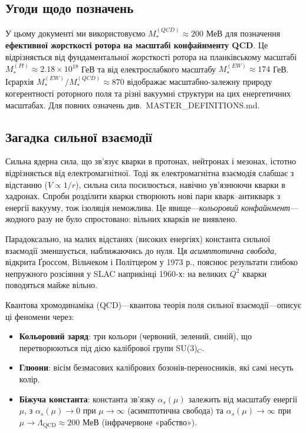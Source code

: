 \documentclass[11pt,a4paper]{article}
\theoremstyle{definition}
\theoremstyle{plain}
\theoremstyle{remark}
\begin{document}
\subsection{Угоди щодо позначень}

У цьому документі ми використовуємо $M_*^{(QCD)} \approx 200$ МеВ для позначення \textbf{ефективної жорсткості ротора на масштабі конфайнменту QCD}. Це відрізняється від фундаментальної жорсткості ротора на планківському масштабі $M_*^{(Pl)} \approx 2{.}18 \times 10^{18}$ ГеВ та від електрослабкого масштабу $M_*^{(EW)} \approx 174$ ГеВ. Ієрархія $M_*^{(EW)}/M_*^{(QCD)} \approx 870$ відображає масштабно-залежну природу когерентності роторного поля та різні вакуумні структури на цих енергетичних масштабах. Для повних означень див.\ MASTER\_DEFINITIONS.md.

\subsection{Загадка сильної взаємодії}

Сильна ядерна сила, що зв’язує кварки в протонах, нейтронах і мезонах, істотно відрізняється від електромагнітної. Тоді як електромагнітна взаємодія слабшає з відстанню ($V \propto 1/r$), сильна сила посилюється, навічно ув’язнюючи кварки в хадронах. Спроби розділити кварки створюють нові пари кварк–антикварк з енергії вакууму, тож ізоляція неможлива. Це явище—\emph{кольоровий конфайнмент}—жодного разу не було спростовано: вільних кварків не виявлено.

Парадоксально, на малих відстанях (високих енергіях) константа сильної взаємодії зменшується, наближаючись до нуля. Ця \emph{асимптотична свобода}, відкрита Ґроссом, Вільчеком і Політцером у 1973 р., пояснює результати глибоко непружного розсіяння у SLAC наприкінці 1960-х: на великих $Q^2$ кварки поводяться майже вільно.

Квантова хромодинаміка (QCD)—квантова теорія поля сильної взаємодії—описує ці феномени через:
\begin{itemize}[leftmargin=*,itemsep=3pt]
  \item \textbf{Кольоровий заряд}: три кольори (червоний, зелений, синій), що перетворюються під дією калібрової групи SU(3)$_C$.
  \item \textbf{Глюони}: вісім безмасових калібрових бозонів-переносників, які самі несуть колір.
  \item \textbf{Біжуча константа}: константа зв’язку $\alpha_s(\mu)$ залежить від масштабу енергії $\mu$, з $\alpha_s(\mu)\to 0$ при $\mu\to\infty$ (асимптотична свобода) та $\alpha_s(\mu)\to\infty$ при $\mu\to\Lambda_{\mathrm{QCD}}\approx 200$ МеВ (інфрачервоне «рабство»).
\end{itemize}
\end{document}
